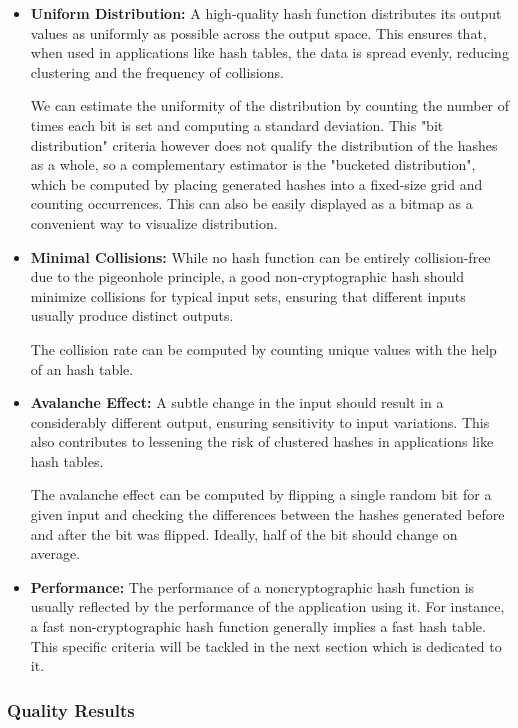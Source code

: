 \documentclass[10pt]{article}
\begin{document}
\begin{itemize}
    \item \textbf{Uniform Distribution:} A high-quality hash function distributes its output values as uniformly as possible across the output space. This ensures that, when used in applications like hash tables, the data is spread evenly, reducing clustering and the frequency of collisions.

    We can estimate the uniformity of the distribution by counting the number of times each bit is set and computing a standard deviation. This "bit distribution" criteria however does not qualify the distribution of the hashes as a whole, so a complementary estimator is the "bucketed distribution", which be computed by placing generated hashes into a fixed-size grid and counting occurrences. This can also be easily displayed as a bitmap as a convenient way to visualize distribution.
    \item \textbf{Minimal Collisions:} While no hash function can be entirely collision-free due to the pigeonhole principle, a good non-cryptographic hash should minimize collisions for typical input sets, ensuring that different inputs usually produce distinct outputs.
    
    The collision rate can be computed by counting unique values with the help of an hash table.
    \item \textbf{Avalanche Effect:} A subtle change in the input should result in a considerably different output, ensuring sensitivity to input variations. This also contributes to lessening the risk of clustered hashes in applications like hash tables.
    
    The avalanche effect can be computed by flipping a single random bit for a given input and checking the differences between the hashes generated before and after the bit was flipped. Ideally, half of the bit should change on average.
    \item \textbf{Performance:} The performance of a noncryptographic hash function is usually reflected by the performance of the application using it. For instance, a fast non-cryptographic hash function generally implies a fast hash table. This specific criteria will be tackled in the next section which is dedicated to it. 

\end{itemize}

\subsubsection{Quality Results}
\end{document}
